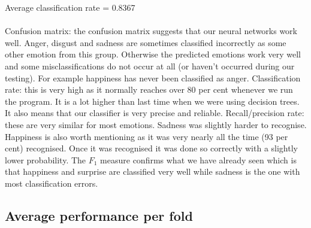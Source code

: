 \documentclass[12pt]{article}
\begin{document}
Average classification rate = 0.8367 \\ \\
Confusion matrix: the confusion matrix suggests that our neural networks work well. Anger, disgust and sadness are sometimes classified incorrectly as some other emotion from this group. Otherwise the predicted emotions work very well and some misclassifications do not occur at all (or haven't occurred during our testing). For example happiness has never been classified as anger. Classification rate: this is very high as it normally reaches over 80 per cent whenever we run the program. It is a lot higher than last time when we were using decision trees. It also means that our classifier is very precise and reliable. Recall/precision rate: these are very similar for most emotions. Sadness was slightly harder to recognise. Happiness is also worth mentioning as it was very nearly all the time (93 per cent) recognised. Once it was recognised it was done so correctly with a slightly lower probability. The $F_1$ measure confirms what we have already seen which is that happiness and surprise are classified very well while sadness is the one with most classification errors.


\subsection*{Average performance per fold}




\end{document}
